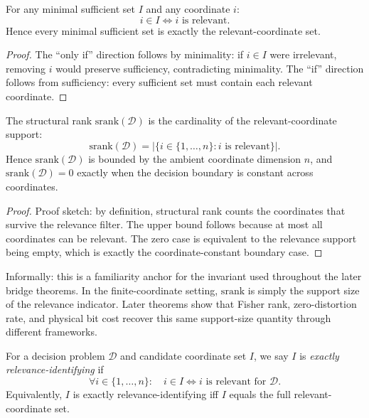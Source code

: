 \begin{proposition}\label{prop:minimal-relevant-equiv}
For any minimal sufficient set $I$ and any coordinate $i$:
\[
i \in I \iff i \text{ is relevant}.
\]
Hence every minimal sufficient set is exactly the relevant-coordinate set.
\end{proposition}

\begin{proof}
The ``only if'' direction follows by minimality: if $i\in I$ were irrelevant, removing $i$ would preserve sufficiency, contradicting minimality. The ``if'' direction follows from sufficiency: every sufficient set must contain each relevant coordinate.
\end{proof}

\begin{proposition}\label{prop:srank-support}
The structural rank $\mathrm{srank}(\mathcal{D})$ is the cardinality of the relevant-coordinate support:
\[
\mathrm{srank}(\mathcal{D})
=
\left|\{i \in \{1,\ldots,n\} : i \text{ is relevant}\}\right|.
\]
Hence $\mathrm{srank}(\mathcal{D})$ is bounded by the ambient coordinate dimension $n$, and $\mathrm{srank}(\mathcal{D}) = 0$ exactly when the decision boundary is constant across coordinates.
\end{proposition}

\begin{proof}
Proof sketch: by definition, structural rank counts the coordinates that survive the relevance filter. The upper bound follows because at most all coordinates can be relevant. The zero case is equivalent to the relevance support being empty, which is exactly the coordinate-constant boundary case.
\end{proof}

Informally: this is a familiarity anchor for the invariant used throughout the later bridge theorems. In the finite-coordinate setting, $\mathrm{srank}$ is simply the support size of the relevance indicator. Later theorems show that Fisher rank, zero-distortion rate, and physical bit cost recover this same support-size quantity through different frameworks.

\begin{definition}\label{def:exact-identifiability}
For a decision problem $\mathcal{D}$ and candidate coordinate set $I$, we say $I$ is \emph{exactly relevance-identifying} if
\[
\forall i \in \{1,\ldots,n\}:\quad i \in I \iff i \text{ is relevant for } \mathcal{D}.
\]
Equivalently, $I$ is exactly relevance-identifying iff $I$ equals the full relevant-coordinate set.
\end{definition}

